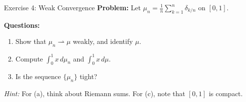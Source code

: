 \documentclass[aspectratio=169]{beamer}
\begin{document}
\begin{frame}{Exercise 4: Weak Convergence}
\textbf{Problem:} Let $\mu_n = \frac{1}{n}\sum_{k=1}^{n} \delta_{k/n}$ on $[0,1]$.

\vspace{0.3cm}
\textbf{Questions:}
\begin{enumerate}
    \item[(a)] Show that $\mu_n \rightharpoonup \mu$ weakly, and identify $\mu$.
    \item[(b)] Compute $\int_0^1 x \, d\mu_n$ and $\int_0^1 x \, d\mu$.
    \item[(c)] Is the sequence $\{\mu_n\}$ tight?
\end{enumerate}

\vspace{0.5cm}
\textit{Hint:} For (a), think about Riemann sums. For (c), note that $[0,1]$ is compact.
\end{frame}
\end{document}
